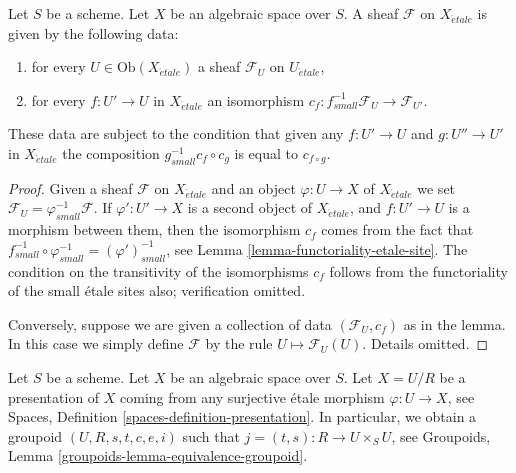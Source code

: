 \begin{lemma}
\label{lemma-characterize-sheaf-small-etale}
Let $S$ be a scheme. Let $X$ be an algebraic space over $S$.
A sheaf $\mathcal{F}$ on $X_{\acute{e}tale}$ is given by the following data:
\begin{enumerate}
\item for every $U \in \text{Ob}(X_{\acute{e}tale})$ a sheaf
$\mathcal{F}_U$ on $U_{\acute{e}tale}$,
\item for every $f : U' \to U$ in $X_{\acute{e}tale}$ an isomorphism
$c_f : f_{small}^{-1}\mathcal{F}_U \to \mathcal{F}_{U'}$.
\end{enumerate}
These data are subject to the condition that given any $f : U' \to U$
and $g : U'' \to U'$ in $X_{\acute{e}tale}$ the composition
$g_{small}^{-1}c_f \circ c_g$ is equal to $c_{f \circ g}$.
\end{lemma}

\begin{proof}
Given a sheaf $\mathcal{F}$ on $X_{\acute{e}tale}$ and an object
$\varphi : U \to X$ of
$X_{\acute{e}tale}$ we set $\mathcal{F}_U = \varphi_{small}^{-1}\mathcal{F}$.
If $\varphi' : U' \to X$ is a second object of $X_{\acute{e}tale}$, and
$f : U' \to U$ is a morphism between them, then
the isomorphism $c_f$ comes from the fact that
$f_{small}^{-1} \circ \varphi_{small}^{-1} = (\varphi')^{-1}_{small}$, see
Lemma \ref{lemma-functoriality-etale-site}. The condition on the
transitivity of the isomorphisms $c_f$ follows from the functoriality
of the small \'etale sites also; verification omitted.

\medskip\noindent
Conversely, suppose we are given a collection of data $(\mathcal{F}_U, c_f)$
as in the lemma. In this case we simply define $\mathcal{F}$ by the rule
$U \mapsto \mathcal{F}_U(U)$. Details omitted.
\end{proof}

\noindent
Let $S$ be a scheme. Let $X$ be an algebraic space over $S$.
Let $X = U/R$ be a presentation of $X$ coming from any surjective
\'etale morphism $\varphi : U \to X$, see
Spaces, Definition \ref{spaces-definition-presentation}.
In particular, we obtain a groupoid $(U, R, s, t, c, e, i)$ such that
$j = (t, s) : R \to U \times_S U$, see
Groupoids, Lemma \ref{groupoids-lemma-equivalence-groupoid}.

